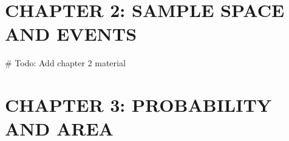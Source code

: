 \documentclass[12pt]{article}
\begin{document}
\section*{CHAPTER 2: SAMPLE SPACE AND EVENTS}

$\#$ Todo: Add chapter $2$ material

\section*{CHAPTER 3: PROBABILITY AND AREA}
\end{document}
